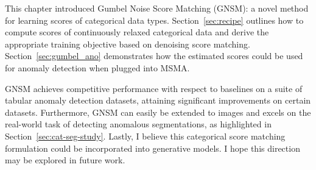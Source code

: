 This chapter introduced Gumbel Noise Score Matching (GNSM): a novel method for learning scores of categorical data types. Section~\ref{sec:recipe} outlines how to compute scores of continuously relaxed categorical data and derive the appropriate training objective based on denoising score matching. Section~\ref{sec:gumbel_ano} demonstrates how the estimated scores could be used for anomaly detection when plugged into MSMA.

GNSM achieves competitive performance with respect to baselines on a suite of tabular anomaly detection datasets, attaining significant improvements on certain datasets. Furthermore, GNSM can easily be extended to images and excels on the real-world task of detecting anomalous segmentations, as highlighted in Section~\ref{sec:cat-seg-study}. Lastly, I believe this categorical score matching formulation could be incorporated into generative models. I hope this direction may be explored in future work.




